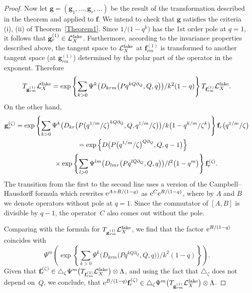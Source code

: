 \documentclass[pdftex]{sigma}
\def\L{\mathcal L}
\def\p{\partial}
\def\f{{\mathbf f}}
\def\g{{\mathbf g}}
\renewcommand{\Delta}{\triangle}
\begin{document}
\begin{proof}
 Now let $\g =(\g_1,\dots,\g_r,\dots)$ be the result of the transformation described in the theorem and applied to $\f$. We intend to check that $\g$ satisfies the criteria (i), (ii) of Theorem~\ref{Theorem1}. Since $1/\big(1-q^k\big)$ has the 1st order pole at $q=1$, it follows that $\g_r^{(1)}\in \L_X^{\rm fake}$. Furthermore, according to the invariance properties described above, the tangent space to $\L_X^{\rm fake}$ at $\f_{rm}^{(1)}$ is transformed to another tangent space (at $\g_{rm}^{(1)}$) determined by the polar part of the operator in the exponent. Therefore
\[ T_{\g_{rm}^{(1)}}\L_X^{\rm fake} = \exp\left\{\sum_{k>0} \Psi^k\big(D_{krm}\big(Pq^{kQ\p_Q},Q,q\big)\big)/k^2(1-q)\right\} T_{\f_{rm}^{(1)}}\L_X^{\rm fake} .\]
On the other hand,
\begin{gather*} \g_r^{(\zeta)} = \exp\left\{\sum_{k>0} \Psi^k \big(D_{kr}\big(P\big(q^{1/m}/\zeta\big)^{kQ\p_Q},Q,q^{1/m}/\zeta\big)\big)/k\big(1-q^{k/m}/\zeta^k\big)\right\} \f_r\big(q^{1/m}/\zeta\big) \\
\hphantom{\g_r^{(\zeta)}}{}
= \exp\left\{D\big(P\big(q^{1/m}/\zeta\big)^{Q\p_Q}, Q, q-1\big)\right\}\\
\hphantom{\g_r^{(\zeta)}=}{} \times\exp\left\{\sum_{l>0} \Psi^{lm} \big(D_{lmr}\big(Pq^{lQ\p_Q},Q,q\big)\big)/l^2\big(1-q^m\big)\right\} \f_r^{(\zeta)} .\end{gather*}
The transition from the first to the second line uses a version of the Campbell--Hausdorff formula which rewrites
${\rm e}^{A+B/(1-q)}$ as ${\rm e}^C{\rm e}^{B/(1-q)}$, where by $A$ and $B$ we denote operators without pole at $q=1$. Since the commutator of $[A,B]$ is divisible by $q-1$, the operator~$C$ also comes out without the pole.

Comparing with the formula for $T_{\g_{rm}^{(1)}}\L_X^{\rm fake}$, we find that the factor ${\rm e}^{B/(1-q)}$ coincides with
\[ \Psi^m \left(\exp\left\{ \sum_{k>0} \Psi^k\big(D_{krm}\big(Pq^{kQ\p_Q},Q,q\big)\big)/k^2(1-q)\right\} \right) .\]
Given that $\f_r^{(\zeta)} \in \Delta_{\zeta} \Psi^m\big(T_{\f_{rm}^{(1)}}\L_X^{\rm fake}\big)\otimes \Lambda$, and using the fact that $\Delta_{\zeta}$ does not depend on~$Q$, we conclude, that ${\rm e}^{B/(1-q)}\f_r^{(\zeta)} \in \Delta_{\zeta} \Psi^m\big(T_{\g_{rm}^{(1)}}\L_X^{\rm fake}\big)\otimes \Lambda$.


\end{proof}
\end{document}
